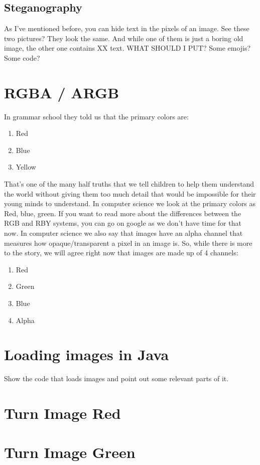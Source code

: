 \documentclass[12pt]{article}
\begin{document}
\subsection{Steganography}
As I've mentioned before, you can hide text in the pixels of an image.
See these two pictures? They look the same. And while one of them is just a boring old image, the other one contains XX text. WHAT SHOULD I PUT? Some emojis? Some code?

\section{RGBA / ARGB}
In grammar school they told us that the primary colors are:
\begin{enumerate}
\item Red
\item Blue
\item Yellow
\end{enumerate}
That's one of the many half truths that we tell children to help them understand the world without giving them too much detail that would be impossible for their young minds to understand. In computer science we look at the primary colors as Red, blue, green. If you want to read more about the differences between the RGB and RBY systems, you can go on google as we don't have time for that now. In computer science we also say that images have an alpha channel that measures how opaque/transparent a pixel in an image is. So, while there is more to the story, we will agree right now that images are made up of 4 channels:
\begin{enumerate}
\item Red
\item Green
\item Blue
\item Alpha
\end{enumerate}

\section{Loading images in Java}
Show the code that loads images and point out some relevant parts of it.

\section{Turn Image Red}

\section{Turn Image Green}
\end{document}
